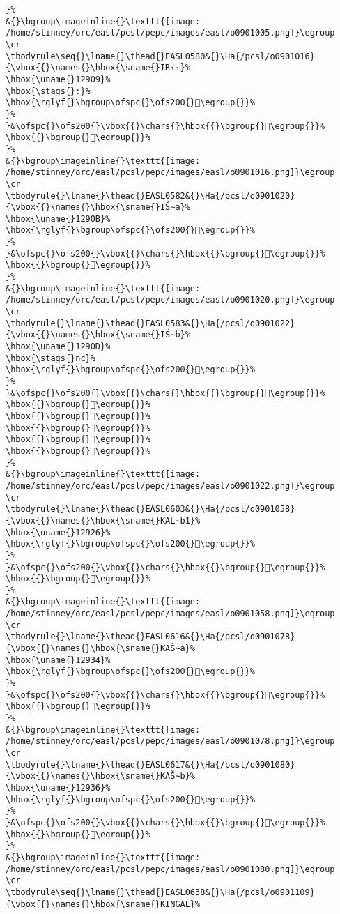 \begin{verbatim}
}%
&{}\bgroup\imageinline{}\texttt{[image: /home/stinney/orc/easl/pcsl/pepc/images/easl/o0901005.png]}\egroup
\cr
\tbodyrule\seq{}\lname{}\thead{}EASL0580&{}\Ha{/pcsl/o0901016}{\vbox{{}\names{}\hbox{\sname{}IR₁₁}%
\hbox{\uname{}12909}%
\hbox{\stags{}:}%
\hbox{\rglyf{}\bgroup\ofspc{}\ofs200{}𒤉\egroup{}}%
}%
}&\ofspc{}\ofs200{}\vbox{{}\chars{}\hbox{{}\bgroup{}𒤈\egroup{}}%
\hbox{{}\bgroup{}𒤉\egroup{}}%
}%
&{}\bgroup\imageinline{}\texttt{[image: /home/stinney/orc/easl/pcsl/pepc/images/easl/o0901016.png]}\egroup
\cr
\tbodyrule{}\lname{}\thead{}EASL0582&{}\Ha{/pcsl/o0901020}{\vbox{{}\names{}\hbox{\sname{}IŠ∼a}%
\hbox{\uname{}1290B}%
\hbox{\rglyf{}\bgroup\ofspc{}\ofs200{}𒤋\egroup{}}%
}%
}&\ofspc{}\ofs200{}\vbox{{}\chars{}\hbox{{}\bgroup{}𒤌\egroup{}}%
\hbox{{}\bgroup{}𒤋\egroup{}}%
}%
&{}\bgroup\imageinline{}\texttt{[image: /home/stinney/orc/easl/pcsl/pepc/images/easl/o0901020.png]}\egroup
\cr
\tbodyrule{}\lname{}\thead{}EASL0583&{}\Ha{/pcsl/o0901022}{\vbox{{}\names{}\hbox{\sname{}IŠ∼b}%
\hbox{\uname{}1290D}%
\hbox{\stags{}nc}%
\hbox{\rglyf{}\bgroup\ofspc{}\ofs200{}𒤍\egroup{}}%
}%
}&\ofspc{}\ofs200{}\vbox{{}\chars{}\hbox{{}\bgroup{}𒤍\egroup{}}%
\hbox{{}\bgroup{}𒤎\egroup{}}%
\hbox{{}\bgroup{}𒤏\egroup{}}%
\hbox{{}\bgroup{}𒤐\egroup{}}%
\hbox{{}\bgroup{}𒤑\egroup{}}%
\hbox{{}\bgroup{}𒤒\egroup{}}%
}%
&{}\bgroup\imageinline{}\texttt{[image: /home/stinney/orc/easl/pcsl/pepc/images/easl/o0901022.png]}\egroup
\cr
\tbodyrule{}\lname{}\thead{}EASL0603&{}\Ha{/pcsl/o0901058}{\vbox{{}\names{}\hbox{\sname{}KAL∼b1}%
\hbox{\uname{}12926}%
\hbox{\rglyf{}\bgroup\ofspc{}\ofs200{}𒤦\egroup{}}%
}%
}&\ofspc{}\ofs200{}\vbox{{}\chars{}\hbox{{}\bgroup{}𒤦\egroup{}}%
\hbox{{}\bgroup{}𒤧\egroup{}}%
}%
&{}\bgroup\imageinline{}\texttt{[image: /home/stinney/orc/easl/pcsl/pepc/images/easl/o0901058.png]}\egroup
\cr
\tbodyrule{}\lname{}\thead{}EASL0616&{}\Ha{/pcsl/o0901078}{\vbox{{}\names{}\hbox{\sname{}KAŠ∼a}%
\hbox{\uname{}12934}%
\hbox{\rglyf{}\bgroup\ofspc{}\ofs200{}𒤴\egroup{}}%
}%
}&\ofspc{}\ofs200{}\vbox{{}\chars{}\hbox{{}\bgroup{}𒤵\egroup{}}%
\hbox{{}\bgroup{}𒤴\egroup{}}%
}%
&{}\bgroup\imageinline{}\texttt{[image: /home/stinney/orc/easl/pcsl/pepc/images/easl/o0901078.png]}\egroup
\cr
\tbodyrule{}\lname{}\thead{}EASL0617&{}\Ha{/pcsl/o0901080}{\vbox{{}\names{}\hbox{\sname{}KAŠ∼b}%
\hbox{\uname{}12936}%
\hbox{\rglyf{}\bgroup\ofspc{}\ofs200{}𒤶\egroup{}}%
}%
}&\ofspc{}\ofs200{}\vbox{{}\chars{}\hbox{{}\bgroup{}𒤸\egroup{}}%
\hbox{{}\bgroup{}𒤶\egroup{}}%
}%
&{}\bgroup\imageinline{}\texttt{[image: /home/stinney/orc/easl/pcsl/pepc/images/easl/o0901080.png]}\egroup
\cr
\tbodyrule\seq{}\lname{}\thead{}EASL0638&{}\Ha{/pcsl/o0901109}{\vbox{{}\names{}\hbox{\sname{}KINGAL}%

\end{verbatim}
